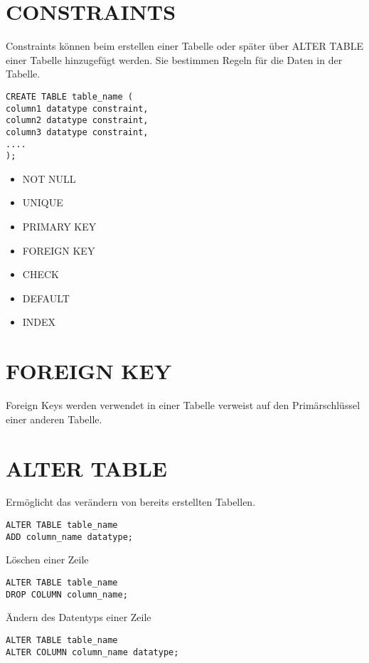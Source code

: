 \documentclass[fleqn,10pt]{SelfArx} %
\begin{document}
\flushbottom %



\tableofcontents %

\thispagestyle{empty} %

\clearpage

\section{CONSTRAINTS}
Constraints können beim erstellen einer Tabelle oder später über ALTER TABLE einer Tabelle hinzugefügt werden. Sie bestimmen Regeln für die Daten in der Tabelle.
\begin{verbatim}
CREATE TABLE table_name (
column1 datatype constraint,
column2 datatype constraint,
column3 datatype constraint,
....
); 
\end{verbatim}

\begin{itemize}[noitemsep] %
\item NOT NULL
\item UNIQUE
\item PRIMARY KEY
\item FOREIGN KEY
\item CHECK
\item DEFAULT
\item INDEX 
\end{itemize}

\section{FOREIGN KEY}
Foreign Keys werden verwendet in einer Tabelle verweist auf den Primärschlüssel einer anderen Tabelle. 
\section{ALTER TABLE}
Ermöglicht das verändern von bereits erstellten Tabellen.

\begin{verbatim}
ALTER TABLE table_name
ADD column_name datatype;
\end{verbatim}
\noindent
Löschen einer Zeile
\begin{verbatim}
ALTER TABLE table_name
DROP COLUMN column_name;
\end{verbatim}
\noindent
Ändern des Datentyps einer Zeile
\begin{verbatim}
ALTER TABLE table_name
ALTER COLUMN column_name datatype;
\end{verbatim}
\end{document}
